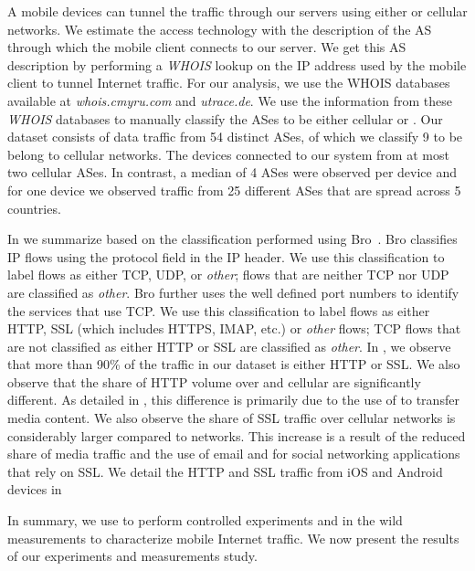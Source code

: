 A mobile devices can tunnel the traffic through our \platname servers using either \wifi or cellular networks. 
We estimate the access technology with the description of the AS through which the mobile client connects to our \platname server. 
We get this AS description by performing a \emph{WHOIS} lookup on the IP address used by the mobile client to tunnel Internet traffic. 
For our analysis, we use the WHOIS databases available at \emph{whois.cmyru.com} and \emph{utrace.de}.
We use the information from these \emph{WHOIS} databases to manually classify the ASes to be either cellular or \wifi.
Our dataset consists of data traffic from 54 distinct ASes, of which we classify 9 to be belong to cellular networks.
The devices connected to our system from at most two cellular ASes.
In contrast, a median of 4 \wifi ASes were observed per device and for one device we observed traffic from 25 different \wifi ASes that are spread across 5 countries. 

In  we summarize \mobWild based on the classification performed using Bro~\cite{bro}.
Bro classifies IP flows using the protocol field in the IP header.
We use this classification to label flows as either TCP, UDP, or \emph{other}; flows that are neither TCP nor UDP are classified as \emph{other}. 
Bro further uses the well defined port numbers to identify the services that use TCP.
We use this classification to label flows as either HTTP, SSL (which includes HTTPS, IMAP, etc.) or \emph{other} flows; TCP flows that are not classified as either HTTP or SSL are classified as \emph{other}.
In , we observe that more than 90\% of the traffic in our dataset is either HTTP or SSL. 
We also observe that the share of HTTP volume over \wifi and cellular are significantly different. 
As detailed in , this difference is primarily due to the use of \wifi to transfer media content.
We also observe the share of SSL traffic over cellular networks is considerably larger compared to \wifi networks.
This increase is a result of the reduced share of media traffic and the use of email and for social networking applications that rely on SSL.
We detail the HTTP and SSL traffic from iOS and Android devices in 

In summary, we use \platname to perform controlled experiments and in the wild measurements to characterize mobile Internet traffic. 
We now present the results of our experiments and measurements study. 




